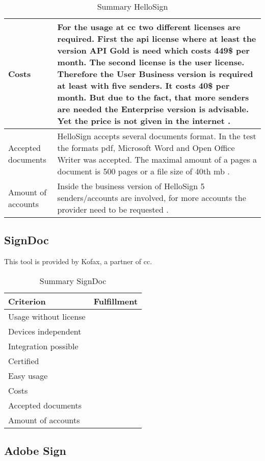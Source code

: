 \begin{table}[h]
\begin{tabular}{|p{4cm}|p{10cm}|}
		Costs & For the usage at \gls{cc} two different licenses are required. First the \gls{api} license where at least the version API Gold is need which costs 449\$ per month. The second license is the user license. Therefore the User Business version is required at least with five senders. It costs 40\$ per month. But due to the fact, that more senders are needed the Enterprise version is advisable. Yet the price is not given in the internet\parencite{hellosign2018price,hellosign2018api} .\\ \hline
		Accepted documents & HelloSign accepts several documents format. In the test the formats \gls{pdf}, Microsoft Word and Open Office Writer was accepted. The maximal amount of a pages a document is 500 pages or a file size of 40th \gls{mb} \parencite{hellosign2018documents}. \\ \hline
		Amount of accounts & Inside the business version of HelloSign 5 senders/accounts are involved, for more accounts the provider need to be requested \parencite{hellosign2018price}. \\ \hline
	\end{tabular}
	\caption{Summary HelloSign}
	\label{tab:hellosign}
\end{table}

\subsection{SignDoc}
This tool is provided by Kofax, a partner of \gls{cc}.

\begin{table}[h]
	\begin{tabular}{|p{4cm}|p{10cm}|} \hline
		Criterion & Fulfillment \\ \hline
		Usage without license & \\ \hline
		Devices independent & \\ \hline
		Integration possible & \\ \hline
		Certified & \\ \hline
		Easy usage & \\ \hline
		Costs & \\ \hline
		Accepted documents & \\ \hline
		Amount of accounts & \\ \hline
	\end{tabular}
	\caption{Summary SignDoc}
	\label{tab:signdoc}
\end{table}

\subsection{Adobe Sign}

